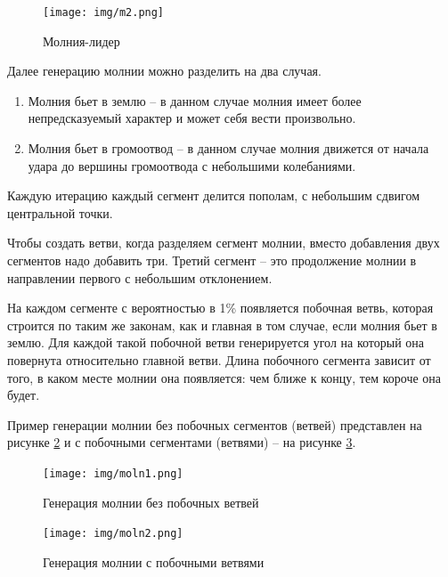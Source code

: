 \begin{figure}[H]
	\begin{center}
		\texttt{[image: img/m2.png]}
	\end{center}
	\captionsetup{justification=centering}
	\caption{Молния-лидер}
	\label{img:m2}
\end{figure}



Далее генерацию молнии можно разделить на два случая.
\begin{enumerate}
	\item Молния бьет в землю – в данном случае молния имеет более непредсказуемый характер и может себя вести произвольно.
	\item Молния бьет в громоотвод – в данном случае молния движется от начала удара до вершины громоотвода с небольшими колебаниями.
\end{enumerate}

Каждую итерацию каждый сегмент делится пополам, с небольшим сдвигом центральной точки.

Чтобы создать ветви, когда разделяем сегмент молнии, вместо добавления двух сегментов надо добавить три. Третий сегмент – это продолжение молнии в направлении первого с небольшим отклонением.

На каждом сегменте с вероятностью в 1\% появляется побочная ветвь, которая строится по таким же законам, как и главная в том случае, если молния бьет в землю. Для каждой такой побочной ветви генерируется угол на который она повернута относительно главной ветви. Длина побочного сегмента зависит от того, в каком месте молнии она появляется: чем ближе к концу, тем короче она будет. 

Пример генерации молнии без побочных сегментов (ветвей) представлен на рисунке \ref{img:moln1} и с побочными сегментами (ветвями) -- на рисунке \ref{img:moln2}.


\begin{figure}[H]
	\begin{center}
		\texttt{[image: img/moln1.png]}
	\end{center}
	\captionsetup{justification=centering}
	\caption{Генерация молнии без побочных ветвей}
	\label{img:moln1}
\end{figure}

\begin{figure}[H]
	\begin{center}
		\texttt{[image: img/moln2.png]}
	\end{center}
	\captionsetup{justification=centering}
	\caption{Генерация молнии с побочными ветвями}
	\label{img:moln2}
\end{figure}


